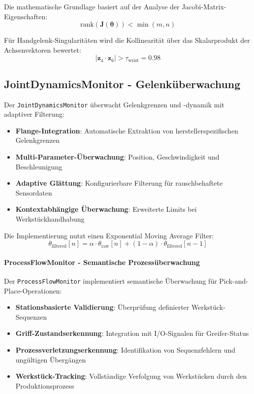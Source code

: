 Die mathematische Grundlage basiert auf der Analyse der
Jacobi-Matrix-Eigenschaften:
\begin{equation}
    \text{rank}(\mathbf{J}(\boldsymbol{\theta})) < \min(m, n)
    \label{eq:singularity_framework}
\end{equation}

Für Handgelenk-Singularitäten wird die Kollinearität über das Skalarprodukt der
Achsenvektoren bewertet:
\begin{equation}
    |\mathbf{z}_4 \cdot \mathbf{z}_6| > \tau_{\text{wrist}} = 0.98
    \label{eq:wrist_singularity_framework}
\end{equation}

\subsection{JointDynamicsMonitor - Gelenküberwachung}
Der \texttt{JointDynamicsMonitor} überwacht Gelenkgrenzen und -dynamik mit
adaptiver Filterung:

\begin{itemize}
    \item \textbf{Flange-Integration}: Automatische Extraktion von herstellerspezifischen Gelenkgrenzen
    \item \textbf{Multi-Parameter-Überwachung}: Position, Geschwindigkeit und Beschleunigung
    \item \textbf{Adaptive Glättung}: Konfigurierbare Filterung für rauschbehaftete Sensordaten
    \item \textbf{Kontextabhängige Überwachung}: Erweiterte Limits bei Werkstückhandhabung
\end{itemize}

Die Implementierung nutzt einen Exponential Moving Average Filter:
\begin{equation}
    \theta_{\text{filtered}}[n] = \alpha \cdot \theta_{\text{raw}}[n] + (1-\alpha) \cdot \theta_{\text{filtered}}[n-1]
    \label{eq:joint_filtering}
\end{equation}

\paragraph{ProcessFlowMonitor - Semantische Prozessüberwachung}
Der \texttt{ProcessFlowMonitor} implementiert semantische Überwachung für
Pick-and-Place-Operationen:

\begin{itemize}
    \item \textbf{Stationsbasierte Validierung}: Überprüfung definierter Werkstück-Sequenzen
    \item \textbf{Griff-Zustandserkennung}: Integration mit I/O-Signalen für Greifer-Status
    \item \textbf{Prozessverletzungserkennung}: Identifikation von Sequenzfehlern und ungültigen Übergängen
    \item \textbf{Werkstück-Tracking}: Vollständige Verfolgung von Werkstücken durch den Produktionsprozess
\end{itemize}


